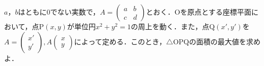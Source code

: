 $a$，$b$はともに$0$でない実数で，$A=\begin{pmatrix} a&b\\c&d \end{pmatrix}$とおく．$\mathrm{O}$を原点とする座標平面において，点$\mathrm{P}(x,y)$が単位円$x^2+y^2=1$の周上を動く．また，点$\mathrm{Q}(x',y')$を$A=\begin{pmatrix} x'\\y'\end{pmatrix}, A\begin{pmatrix} x\\y\end{pmatrix}$によって定める．このとき，$\triangle \mathrm{OPQ}$の面積の最大値を求めよ．
